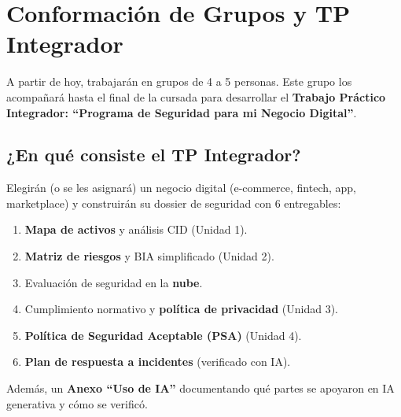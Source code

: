 \documentclass[12pt,a4paper]{article}
\begin{document}
\newpage
\section{Conformaci\'on de Grupos y TP Integrador}

A partir de hoy, trabajar\'an en grupos de 4 a 5 personas. Este grupo los acompa\~nar\'a hasta el final de la cursada para desarrollar el \textbf{Trabajo Pr\'actico Integrador: ``Programa de Seguridad para mi Negocio Digital''}.

\subsection{¿En qu\'e consiste el TP Integrador?}
Elegir\'an (o se les asignar\'a) un negocio digital (e-commerce, fintech, app, marketplace) y construir\'an su dossier de seguridad con 6 entregables:
\begin{enumerate}[leftmargin=2em]
    \item \textbf{Mapa de activos} y an\'alisis CID (Unidad 1).
    \item \textbf{Matriz de riesgos} y BIA simplificado (Unidad 2).
    \item Evaluaci\'on de seguridad en la \textbf{nube}.
    \item Cumplimiento normativo y \textbf{pol\'itica de privacidad} (Unidad 3).
    \item \textbf{Pol\'itica de Seguridad Aceptable (PSA)} (Unidad 4).
    \item \textbf{Plan de respuesta a incidentes} (verificado con IA).
\end{enumerate}
Adem\'as, un \textbf{Anexo ``Uso de IA''} documentando qu\'e partes se apoyaron en IA generativa y c\'omo se verific\'o.
\end{document}
